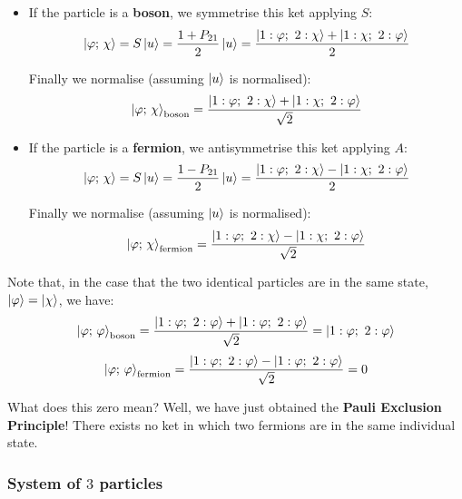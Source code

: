 \begin{itemize}
    \item If the particle is a \textbf{boson}, we symmetrise this ket applying $S$:
    \begin{equation}
        \ket{\varphi;\, \chi} = S\ket{u} = \frac{1 + P_{21}}{2}\ket{u} = \frac{\ket{1:\varphi;\ 2:\chi} + \ket{1:\chi;\ 2:\varphi}}{2}
    \end{equation}

    Finally we normalise (assuming $\ket{u}$ is normalised):
    \begin{equation}
        \ket{\varphi;\, \chi}_\text{boson} = \frac{\ket{1:\varphi;\ 2:\chi} + \ket{1:\chi;\ 2:\varphi}}{\sqrt{2}}
    \end{equation}
    \item If the particle is a \textbf{fermion}, we antisymmetrise this ket applying $A$:
    \begin{equation}
        \ket{\varphi;\, \chi} = S\ket{u} = \frac{1 - P_{21}}{2}\ket{u} = \frac{\ket{1:\varphi;\ 2:\chi} - \ket{1:\chi;\ 2:\varphi}}{2}
    \end{equation}

    Finally we normalise (assuming $\ket{u}$ is normalised):
    \begin{equation}
        \ket{\varphi;\, \chi}_\text{fermion} = \frac{\ket{1:\varphi;\ 2:\chi} - \ket{1:\chi;\ 2:\varphi}}{\sqrt{2}}
    \end{equation}
\end{itemize}

Note that, in the case that the two identical particles are in the same state, $\ket{\varphi} = \ket{\chi}$, we have:
\begin{equation}
    \ket{\varphi;\, \varphi}_\text{boson} = \frac{\ket{1:\varphi;\ 2:\varphi} + \ket{1:\varphi;\ 2:\varphi}}{\sqrt{2}} = \ket{1:\varphi;\ 2:\varphi}
\end{equation}
\begin{equation}
    \ket{\varphi;\, \varphi}_\text{fermion} = \frac{\ket{1:\varphi;\ 2:\varphi} - \ket{1:\varphi;\ 2:\varphi}}{\sqrt{2}} = 0
\end{equation}

What does this zero mean? Well, we have just obtained the \textbf{Pauli Exclusion Principle}! There exists no ket in which two fermions are in the same individual state. 

\subsubsection{System of $3$ particles}

